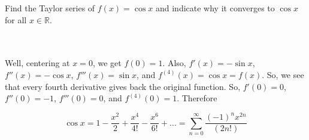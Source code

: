 Find the Taylor series of $f(x)=\cos x$ and indicate why it converges to $\cos x$ for all
$x\in\mathbb{R}$.\\\\

\begin{solution}\renewcommand{\qedsymbol}{}\ \\
    Well, centering at $x=0$, we get $f(0)=1$. Also, $f'(x)=-\sin x$, $f''(x)=-\cos x$,
    $f'''(x)=\sin x$, and $f^{(4)}(x)=\cos x=f(x)$. So, we see that every fourth derivative gives back
    the original function. So, $f'(0)=0$, $f''(0)=-1$, $f'''(0)=0$, and $f^{(4)}(0)=1$. Therefore
    
    $$\cos x=1-\frac{x^2}{2}+\frac{x^4}{4!}-\frac{x^6}{6!}+...
    =\sum_{n=0}^{\infty}\frac{(-1)^nx^{2n}}{(2n!)}$$

\end{solution}